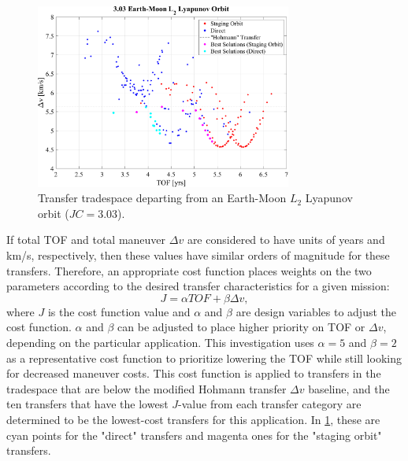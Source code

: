 \begin{figure}[ht]
    \centering
    \includegraphics[width=0.75\textwidth]{figures/TradeSpace_L2Lyapunov_3_03.pdf}
    \caption{Transfer tradespace departing from an Earth-Moon $L_{2}$ Lyapunov orbit ($JC=3.03$).}
    \label{fig:lowDeltav}
\end{figure}

If total TOF and total maneuver $\Delta v$ are considered to have units of years and km/s,
respectively, then these values have similar orders of magnitude for these transfers. Therefore, an
appropriate cost function places weights on the two parameters according to the desired transfer
characteristics for a given mission:
\begin{equation}
    J=\alpha TOF+\beta\Delta v,
    \label{eq:costfunction}
\end{equation}
where $J$ is the cost function value and $\alpha$ and $\beta$ are design variables to adjust the
cost function. $\alpha$ and $\beta$ can be adjusted to place higher priority on TOF or $\Delta v$,
depending on the particular application. This investigation uses $\alpha=5$ and $\beta=2$ as a
representative cost function to prioritize lowering the TOF while still looking for decreased
maneuver costs. This cost function is applied to transfers in the tradespace that are below the
modified Hohmann transfer $\Delta v$ baseline, and the ten transfers that have the lowest $J$-value
from each transfer category are determined to be the lowest-cost transfers for this application. In
\cref{fig:lowDeltav}, these are cyan points for the "direct" transfers and magenta ones for the
"staging orbit" transfers.

